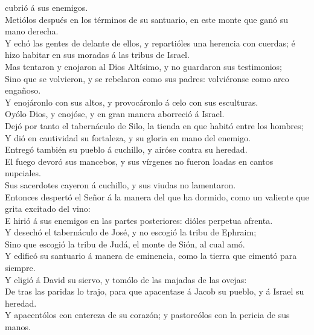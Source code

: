 cubrió á sus enemigos.\\
 Metiólos después en los términos de su santuario, en este
monte que ganó su mano derecha.\\
 Y echó las gentes de delante de ellos, y repartióles una
herencia con cuerdas; é hizo habitar en sus moradas á las tribus de
Israel.\\
 Mas tentaron y enojaron al Dios Altísimo, y no guardaron
sus testimonios;\\
 Sino que se volvieron, y se rebelaron como sus padres:
volviéronse como arco engañoso.\\
 Y enojáronlo con sus altos, y provocáronlo á celo con sus
esculturas.\\
 Oyólo Dios, y enojóse, y en gran manera aborreció á
Israel.\\
 Dejó por tanto el tabernáculo de Silo, la tienda en que
habitó entre los hombres;\\
 Y dió en cautividad su fortaleza, y su gloria en mano del
enemigo.\\
 Entregó también su pueblo á cuchillo, y airóse contra su
heredad.\\
 El fuego devoró sus mancebos, y sus vírgenes no fueron
loadas en cantos nupciales.\\
 Sus sacerdotes cayeron á cuchillo, y sus viudas no
lamentaron.\\
 Entonces despertó el Señor á la manera del que ha dormido,
como un valiente que grita excitado del vino:\\
 E hirió á sus enemigos en las partes posteriores: dióles
perpetua afrenta.\\
 Y desechó el tabernáculo de José, y no escogió la tribu de
Ephraim;\\
 Sino que escogió la tribu de Judá, el monte de Sión, al
cual amó.\\
 Y edificó su santuario á manera de eminencia, como la
tierra que cimentó para siempre.\\
 Y eligió á David su siervo, y tomólo de las majadas de las
ovejas:\\
 De tras las paridas lo trajo, para que apacentase á Jacob
su pueblo, y á Israel su heredad.\\
 Y apacentólos con entereza de su corazón; y pastoreólos
con la pericia de sus manos.

